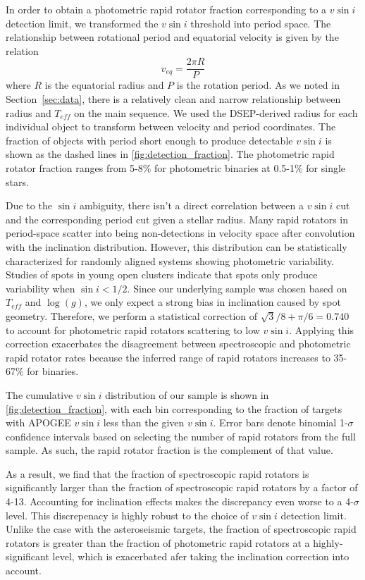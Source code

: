 \documentclass[manuscript]{aastex6}
\newcommand{\vsini}{\ensuremath{v \sin i}}
\newcommand{\Teff}{\ensuremath{T_{eff}}}
\newcommand{\logg}{\ensuremath{\log(g)}}
\newcommand{\gvs}{\authorcomment1}
\begin{document}
\gvs{Also need a uniform method of dealing with inclination biases.}
In order to obtain a photometric rapid rotator fraction corresponding to
a \vsini{} detection limit, we transformed the \vsini{} threshold into period 
space. The relationship between rotational period and equatorial velocity is 
given by the relation 
\begin{displaymath}
    v_{eq} = \frac{2 \pi R}{P} 
\end{displaymath}
where \(R\) is the equatorial radius and \(P\) is the rotation period. As we
noted in Section~\ref{sec:data}, there is a relatively clean and narrow
relationship between radius and \Teff{} on the main sequence. We used the 
DSEP-derived radius for each individual object to transform  between
velocity and period coordinates. The fraction of objects with period
short enough to produce detectable \vsini{} is shown as the dashed 
lines in \cref{fig:detection_fraction}. The photometric rapid rotator fraction
ranges from 5-8\% for photometric binaries at 0.5-1\% for single stars.

Due to the \(\sin i\) ambiguity, there isn't a direct correlation
between a \vsini{} cut and the corresponding period cut given a stellar radius.
Many rapid rotators in period-space scatter into being non-detections in
velocity space after convolution with the inclination distribution. However,
this distribution can be statistically characterized for randomly
aligned systems showing photometric variability. Studies of spots in young open
clusters indicate that spots only produce variability when \(\sin i < 1/2\). 
Since our underlying sample was chosen based on
\Teff{} and \logg{}, we only expect a strong bias in inclination caused by spot
geometry.
Therefore, we perform a statistical correction of \(\sqrt{3}/8+\pi/6=0.740\)
to account for photometric rapid rotators scattering to low
\vsini{}. Applying this correction exacerbates the disagreement between
spectroscopic and photometric rapid rotator rates because the inferred range of
rapid rotators increases to 35-67\% for binaries.

The cumulative \vsini{} distribution of our sample is shown 
in \cref{fig:detection_fraction}, with each bin corresponding to the
fraction of targets with APOGEE \vsini{} less than the given
\vsini{}. Error bars denote  binomial 1-\(\sigma\) confidence 
intervals based on selecting the number of rapid rotators from the full 
sample.  As such, the rapid rotator fraction is the complement of that
value. 

As a result, we find that the fraction of
spectroscopic rapid rotators is significantly larger than the fraction
of spectroscopic rapid rotators by a factor of 4-13. 
Accounting for
inclination effects makes the discrepancy even worse to a 4-\(\sigma\)
level. This discrepenacy is highly robust to the choice of
\vsini{} detection limit. Unlike  
the case with the asteroseismic targets, the fraction of spectroscopic rapid
rotators is greater than the fraction of photometric rapid
rotators at a highly-significant level, which is exacerbated afer taking the
inclination correction into account.
\end{document}
